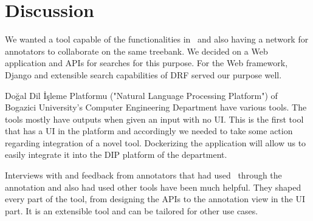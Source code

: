 \section{Discussion}
\label{sec:discussion}

We wanted a tool capable of the functionalities in \boatvone\ and also having a network for annotators to collaborate on the same treebank.
We decided on a Web application and APIs for searches for this purpose.
For the Web framework, Django and extensible search capabilities of DRF served our purpose well.

Doğal Dil İşleme Platformu ("Natural Language Processing Platform") of Bogazici University's Computer Engineering Department have various tools.
The tools mostly have outputs when given an input with no UI.
This is the first tool that has a UI in the platform and accordingly we needed to take some action regarding integration of a novel tool.
Dockerizing the application will allow us to easily integrate it into the DIP platform of the department.\cite{DIP}

Interviews with and feedback from annotators that had used \boatvone\ through the \bountreebank{} annotation and also had used other tools have been much helpful.
They shaped every part of the tool, from designing the APIs to the annotation view in the UI part.
It is an extensible tool and can be tailored for other use cases.
